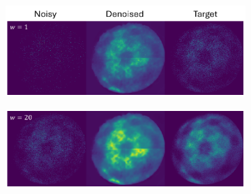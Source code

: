 \begin{figure}
    \centering
    \begin{subfigure}[b]{1\linewidth}
        \centering
        \includegraphics[width=1\linewidth]{images/nn_denoised_xy_w_1.pdf}
        \caption{}
        \label{fig:nn-denoised-xy-w-1}
    \end{subfigure}

    \begin{subfigure}[b]{1\linewidth}
        \centering
        \includegraphics[width=1\linewidth]{images/nn_denoised_xy_w_20.pdf}
        \caption{}
        \label{fig:nn-denoised-xy-w-20}
    \end{subfigure}
    \caption{}
    \label{fig:nn-denoised-xy-w}
\end{figure}